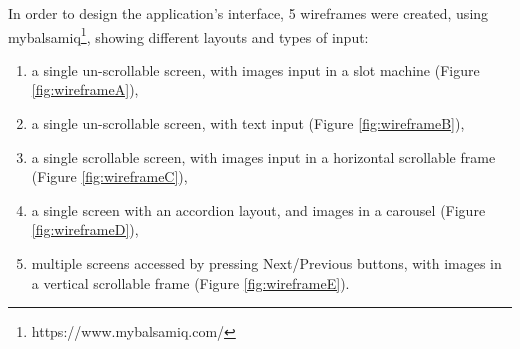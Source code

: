 \documentclass{mproj}
\begin{document}
In order to design the application's interface, 5 wireframes were created, using mybalsamiq\footnote{https://www.mybalsamiq.com/}, showing different layouts and types of input:
\begin{enumerate}[label=\Alph*.]
	\item a single un-scrollable screen, with images input in a slot machine (Figure \ref{fig:wireframeA}),
	\item a single un-scrollable screen, with text input (Figure \ref{fig:wireframeB}),
	\item a single scrollable screen, with images input in a horizontal scrollable frame (Figure \ref{fig:wireframeC}),
	\item a single screen with an accordion layout, and images in a carousel (Figure \ref{fig:wireframeD}),
	\item multiple screens accessed by pressing Next/Previous buttons, with images in a vertical scrollable frame (Figure \ref{fig:wireframeE}).
\end{enumerate}
\end{document}
